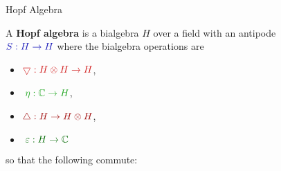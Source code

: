 \documentclass{beamer}
\begin{document}
\begin{frame}[fragile]{Hopf Algebra}

A \textbf{Hopf algebra} is a bialgebra $H$ over a field with an antipode \\\;\;\;\;\;\;\;\;$\color{darkblue}S:H\to H$ \;\;\;where the bialgebra operations are 
\vspace{-2ex}
\begin{multicols}{2}
\begin{itemize}
\item[]<2->$\color{lightred}\bigtriangledown:H\otimes H\to H$, 
\item[]<3->$\color{lightgreen}\;\eta:\mathbb{C}\to H$, 
\item[]<4->$\color{darkred}\triangle:H\to H\otimes H$, 
\item[]<5->$\color{darkgreen}\;\varepsilon:H\to\mathbb{C}$
\end{itemize}
\end{multicols}
\vspace{-2ex}
\pause so that the following commute:


\end{frame}
\end{document}
